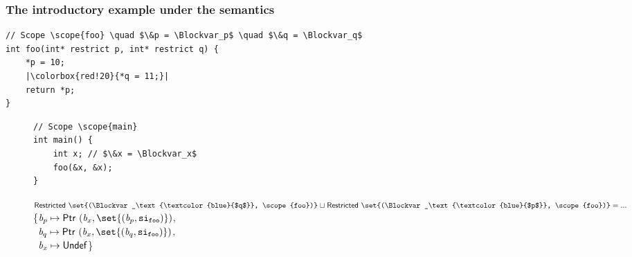 \begin{frame}[fragile]
\frametitle{The introductory example under the \cinkrestrict semantics}
\begin{verbatim}
// Scope \scope{foo} \quad $\&p = \Blockvar_p$ \quad $\&q = \Blockvar_q$
int foo(int* restrict p, int* restrict q) {   
    *p = 10;
    |\colorbox{red!20}{*q = 11;}|
    return *p;
}
\end{verbatim}
\vspace*{-30pt}
\begin{figure}[h]
\centering
\begin{minipage}{.33\textwidth}
\begin{verbatim}
// Scope \scope{main}
int main() {
    int x; // $\&x = \Blockvar_x$
    foo(&x, &x);
}
\end{verbatim}
\end{minipage}%
\begin{minipage}{.67\textwidth}
\colorbox{red!20}{$\restricted{\set{(\Blockvar_\text{\textcolor{blue}{$q$}}, \scope{foo})}} \joinsym \restricted{\set{(\Blockvar_\text{\textcolor{blue}{$p$}}, \scope{foo})}} = ...$}
\\

\executionannotation
{\{$\Blockvar_p \mapsto \ptr{(\Blockvar_x, \set{(\Blockvar_p, \scope{foo})})}$,\\
                                            \ $\Blockvar_q \mapsto \ptr{(\Blockvar_x, \set{(\Blockvar_q, \scope{foo})})}$, \\
                                            \ $\textit{b}_x \mapsto \mathsf{Undef}$\}
}
{
}
\end{minipage}
\end{figure}

\end{frame}




